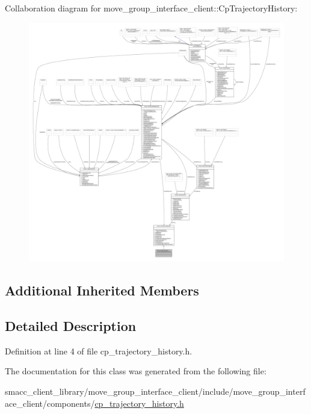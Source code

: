 Collaboration diagram for move\+\_\+group\+\_\+interface\+\_\+client\+:\+:Cp\+Trajectory\+History\+:
\nopagebreak
\begin{figure}[H]
\begin{center}
\leavevmode
\includegraphics[width=350pt]{classmove__group__interface__client_1_1CpTrajectoryHistory__coll__graph}
\end{center}
\end{figure}
\subsection*{Additional Inherited Members}


\subsection{Detailed Description}


Definition at line 4 of file cp\+\_\+trajectory\+\_\+history.\+h.



The documentation for this class was generated from the following file\+:\begin{DoxyCompactItemize}
\item 
smacc\+\_\+client\+\_\+library/move\+\_\+group\+\_\+interface\+\_\+client/include/move\+\_\+group\+\_\+interface\+\_\+client/components/\hyperlink{cp__trajectory__history_8h}{cp\+\_\+trajectory\+\_\+history.\+h}\end{DoxyCompactItemize}

